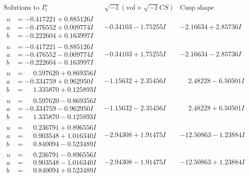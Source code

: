 \documentclass[1p]{elsarticle_modified}
\theoremstyle{definition}
\newcommand{\I}{\sqrt{-1}}
\begin{document}
$$\begin{array}{c|c|c}  
\text{Solutions to }I^u_{1}& \I (\text{vol} + \sqrt{-1}CS) & \text{Cusp shape}\\
 \hline 
\begin{aligned}
u &= -0.417221 + 0.885126 I \\
a &= -0.476552 + 0.009774 I \\
b &= -0.222604 + 0.163997 I\end{aligned}
 & -0.34103 - 1.75255 I & -2.16634 + 2.85736 I \\ \hline\begin{aligned}
u &= -0.417221 - 0.885126 I \\
a &= -0.476552 - 0.009774 I \\
b &= -0.222604 - 0.163997 I\end{aligned}
 & -0.34103 + 1.75255 I & -2.16634 - 2.85736 I \\ \hline\begin{aligned}
u &= \phantom{-}0.597620 + 0.869356 I \\
a &= -0.334759 + 0.962950 I \\
b &= \phantom{-}1.335870 + 0.125893 I\end{aligned}
 & -1.15632 + 2.35456 I & \phantom{-}2.48228 - 6.50501 I \\ \hline\begin{aligned}
u &= \phantom{-}0.597620 - 0.869356 I \\
a &= -0.334759 - 0.962950 I \\
b &= \phantom{-}1.335870 - 0.125893 I\end{aligned}
 & -1.15632 - 2.35456 I & \phantom{-}2.48228 + 6.50501 I \\ \hline\begin{aligned}
u &= \phantom{-}0.236791 + 0.896556 I \\
a &= \phantom{-}0.903548 + 1.016340 I \\
b &= \phantom{-}0.840094 - 0.523489 I\end{aligned}
 & -2.94308 + 1.91475 I & -12.50863 - 1.23884 I \\ \hline\begin{aligned}
u &= \phantom{-}0.236791 - 0.896556 I \\
a &= \phantom{-}0.903548 - 1.016340 I \\
b &= \phantom{-}0.840094 + 0.523489 I\end{aligned}
 & -2.94308 - 1.91475 I & -12.50863 + 1.23884 I \\ \hline\begin{aligned}

\end{aligned}
\end{array}$$
\end{document}
